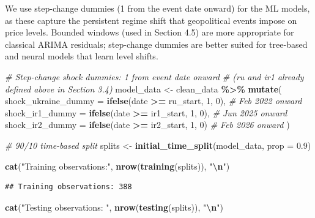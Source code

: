 \documentclass[
]{article}
\newenvironment{Shaded}{\begin{snugshade}}{\end{snugshade}}
\newcommand{\AttributeTok}[1]{\textcolor[rgb]{0.13,0.29,0.53}{#1}}
\newcommand{\CommentTok}[1]{\textcolor[rgb]{0.56,0.35,0.01}{\textit{#1}}}
\newcommand{\DecValTok}[1]{\textcolor[rgb]{0.00,0.00,0.81}{#1}}
\newcommand{\FloatTok}[1]{\textcolor[rgb]{0.00,0.00,0.81}{#1}}
\newcommand{\FunctionTok}[1]{\textcolor[rgb]{0.13,0.29,0.53}{\textbf{#1}}}
\newcommand{\NormalTok}[1]{#1}
\newcommand{\OtherTok}[1]{\textcolor[rgb]{0.56,0.35,0.01}{#1}}
\newcommand{\SpecialCharTok}[1]{\textcolor[rgb]{0.81,0.36,0.00}{\textbf{#1}}}
\newcommand{\StringTok}[1]{\textcolor[rgb]{0.31,0.60,0.02}{#1}}
\begin{document}
We use step-change dummies (1 from the event date onward) for the ML
models, as these capture the persistent regime shift that geopolitical
events impose on price levels. Bounded windows (used in Section 4.5) are
more appropriate for classical ARIMA residuals; step-change dummies are
better suited for tree-based and neural models that learn level shifts.

\begin{Shaded}
\begin{Highlighting}[]
\CommentTok{\# Step{-}change shock dummies: 1 from event date onward}
\CommentTok{\# (ru and ir1 already defined above in Section 3.4)}
\NormalTok{model\_data }\OtherTok{\textless{}{-}}\NormalTok{ clean\_data }\SpecialCharTok{\%\textgreater{}\%}
  \FunctionTok{mutate}\NormalTok{(}
    \AttributeTok{shock\_ukraine\_dummy  =} \FunctionTok{ifelse}\NormalTok{(date }\SpecialCharTok{\textgreater{}=}\NormalTok{ ru\_start,  }\DecValTok{1}\NormalTok{, }\DecValTok{0}\NormalTok{),   }\CommentTok{\# Feb 2022 onward}
    \AttributeTok{shock\_ir1\_dummy      =} \FunctionTok{ifelse}\NormalTok{(date }\SpecialCharTok{\textgreater{}=}\NormalTok{ ir1\_start, }\DecValTok{1}\NormalTok{, }\DecValTok{0}\NormalTok{),   }\CommentTok{\# Jun 2025 onward}
    \AttributeTok{shock\_ir2\_dummy      =} \FunctionTok{ifelse}\NormalTok{(date }\SpecialCharTok{\textgreater{}=}\NormalTok{ ir2\_start, }\DecValTok{1}\NormalTok{, }\DecValTok{0}\NormalTok{)    }\CommentTok{\# Feb 2026 onward}
\NormalTok{  )}

\CommentTok{\# 90/10 time{-}based split}
\NormalTok{splits }\OtherTok{\textless{}{-}} \FunctionTok{initial\_time\_split}\NormalTok{(model\_data, }\AttributeTok{prop =} \FloatTok{0.9}\NormalTok{)}

\FunctionTok{cat}\NormalTok{(}\StringTok{"Training observations:"}\NormalTok{, }\FunctionTok{nrow}\NormalTok{(}\FunctionTok{training}\NormalTok{(splits)), }\StringTok{"}\SpecialCharTok{\textbackslash{}n}\StringTok{"}\NormalTok{)}
\end{Highlighting}
\end{Shaded}

\begin{verbatim}
## Training observations: 388
\end{verbatim}

\begin{Shaded}
\begin{Highlighting}[]
\FunctionTok{cat}\NormalTok{(}\StringTok{"Testing observations: "}\NormalTok{, }\FunctionTok{nrow}\NormalTok{(}\FunctionTok{testing}\NormalTok{(splits)),  }\StringTok{"}\SpecialCharTok{\textbackslash{}n}\StringTok{"}\NormalTok{)}
\end{Highlighting}
\end{Shaded}
\end{document}
